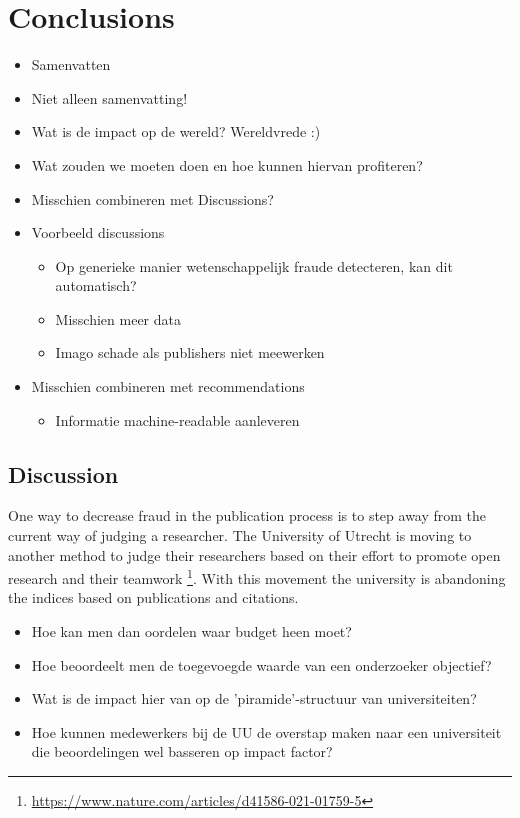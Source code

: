 \documentclass{ou-report}
\newcommand{\outline}[1]{{\color{blue} #1}}
\begin{document}
\chapter{Conclusions}
\label{chp:conclusions}
\outline{
\begin{itemize}
    \item Samenvatten
    \item Niet alleen samenvatting!
    \item Wat is de impact op de wereld? Wereldvrede :)
    \item Wat zouden we moeten doen en hoe kunnen hiervan profiteren?
    \item Misschien combineren met Discussions?
    \item Voorbeeld discussions
    \begin{itemize}
        \item Op generieke manier wetenschappelijk fraude detecteren, kan dit automatisch?
        \item Misschien meer data
        \item Imago schade als publishers niet meewerken
    \end{itemize}
    \item Misschien combineren met recommendations
    \begin{itemize}
        \item Informatie machine-readable aanleveren
    \end{itemize}
\end{itemize}
\section{Discussion}
One way to decrease fraud in the publication process is to step away from the
current way of judging a researcher. The University of Utrecht is moving to 
another method to judge their researchers based on their effort to promote open
research and their teamwork 
\footnote{\url{https://www.nature.com/articles/d41586-021-01759-5}}. With this 
movement the university is abandoning the indices based on publications and 
citations.
\begin{itemize}
    \item Hoe kan men dan oordelen waar budget heen moet?
    \item Hoe beoordeelt men de toegevoegde waarde van een onderzoeker 
    objectief?
    \item Wat is de impact hier van op de 'piramide'-structuur van 
    universiteiten?
    \item Hoe kunnen medewerkers bij de UU de overstap maken naar een 
    universiteit die beoordelingen wel basseren op impact factor?
    
\end{itemize}
}
\end{document}
